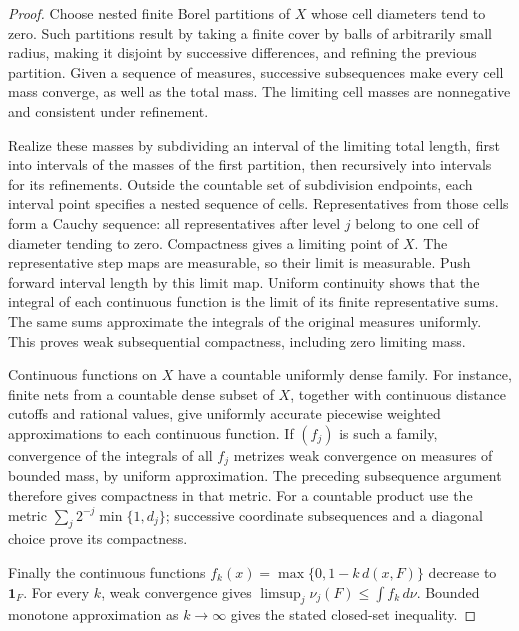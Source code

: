 \begin{proof}
Choose nested finite Borel partitions of $X$ whose cell diameters tend
to zero. Such partitions result by taking a finite cover by balls of
arbitrarily small radius, making it disjoint by successive differences,
and refining the previous partition. Given a sequence of measures,
successive subsequences make every cell mass converge, as well as the
total mass. The limiting cell masses are nonnegative and consistent
under refinement.

Realize these masses by subdividing an interval of the limiting total
length, first into intervals of the masses of the first partition,
then recursively into intervals for its refinements. Outside the
countable set of subdivision endpoints, each interval point specifies
a nested sequence of cells. Representatives from those cells form a
Cauchy sequence: all representatives after level $j$ belong to one
cell of diameter tending to zero. Compactness gives a limiting point
of $X$. The representative step maps are measurable, so their limit
is measurable. Push forward interval length by this limit map.
Uniform continuity shows that the integral of each continuous function
is the limit of its finite representative sums. The same sums
approximate the integrals of the original measures uniformly. This
proves weak subsequential compactness, including zero limiting mass.

Continuous functions on $X$ have a countable uniformly dense family.
For instance, finite nets from a countable dense subset of $X$, together
with continuous distance cutoffs and rational values, give uniformly
accurate piecewise weighted approximations to each continuous function.
If $(f_j)$ is such a family, convergence of the integrals of all $f_j$
metrizes weak convergence on measures of bounded mass, by uniform
approximation. The preceding subsequence argument therefore gives
compactness in that metric. For a countable product use the metric
$\sum_j2^{-j}\min\{1,d_j\}$; successive coordinate subsequences and a
diagonal choice prove its compactness.

Finally the continuous functions
$f_k(x)=\max\{0,1-k\,d(x,F)\}$ decrease to $\mathbf1_F$.
For every $k$, weak convergence gives
$\limsup_j\nu_j(F)\le\int f_k\,d\nu$.
Bounded monotone approximation as $k\to\infty$ gives the stated
closed-set inequality.
\end{proof}

